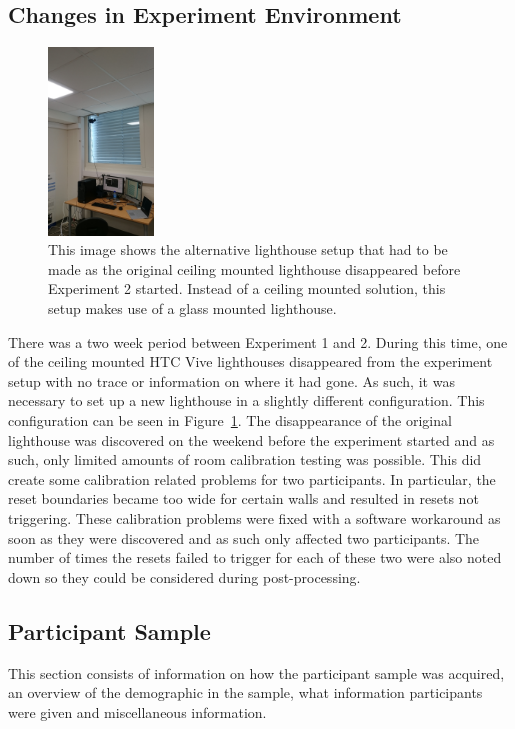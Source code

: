 \subsection{Changes in Experiment Environment}\label{sec:ex2environmentchanges}
\begin{figure}[tbph]
    \centering
    \includegraphics[width=0.25\textwidth]{figures/images/experiment2EnvironmentChanges.jpg}
    \caption[Changes in Experiment Environment for Experiment 2]{This image shows the alternative lighthouse setup that had to be made as the original ceiling mounted lighthouse disappeared before Experiment 2 started. Instead of a ceiling mounted solution, this setup makes use of a glass mounted lighthouse.}
    \label{fig:ex2changedLighthouse}
\end{figure}

There was a two week period between Experiment 1 and 2. During this time, one of the ceiling mounted HTC Vive lighthouses disappeared from the experiment setup with no trace or information on where it had gone. As such, it was necessary to set up a new lighthouse in a slightly different configuration. This configuration can be seen in Figure~\ref{fig:ex2changedLighthouse}. The disappearance of the original lighthouse was discovered on the weekend before the experiment started and as such, only limited amounts of room calibration testing was possible. This did create some calibration related problems for two participants. In particular, the reset boundaries became too wide for certain walls and resulted in resets not triggering. These calibration problems were fixed with a software workaround as soon as they were discovered and as such only affected two participants. The number of times the resets failed to trigger for each of these two were also noted down so they could be considered during post-processing. 

\subsection{Participant Sample}
This section consists of information on how the participant sample was acquired, an overview of the demographic in the sample, what information participants were given and miscellaneous information. 
   
